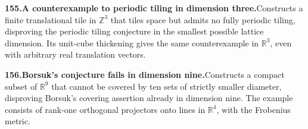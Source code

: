 \documentclass[11pt,a4paper]{article}
\begin{document}
  \par \begin{minipage}{\linewidth}
  \fontsize{10.5}{12.6}\selectfont\RaggedRight
  \hypertarget{result 155}{}
  {\bfseries\textcolor{muted}{155.}\enspace A counterexample to periodic tiling in dimension three.}\enspace Constructs a finite translational tile in $\mathbb Z^3$ that tiles space but admits no fully periodic tiling, disproving the periodic tiling conjecture in the smallest possible lattice dimension. Its unit-cube thickening gives the same counterexample in $\mathbb R^3$, even with arbitrary real translation vectors.\par
  \end{minipage}\par\vspace{5pt}



  \par \begin{minipage}{\linewidth}
  \fontsize{10.5}{12.6}\selectfont\RaggedRight
  \hypertarget{result 156}{}
  {\bfseries\textcolor{muted}{156.}\enspace Borsuk's conjecture fails in dimension nine.}\enspace Constructs a compact subset of $\mathbb R^9$ that cannot be covered by ten sets of strictly smaller diameter, disproving Borsuk's covering assertion already in dimension nine. The example consists of rank-one orthogonal projectors onto lines in $\mathbb R^4$, with the Frobenius metric.\par
  \end{minipage}\par\vspace{5pt}
\end{document}
